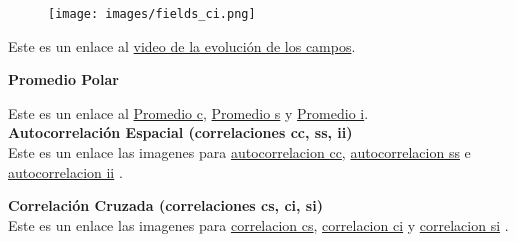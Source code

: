 \documentclass{article}
\begin{document}
\begin{figure}[htbp]
    \centering
    \texttt{[image: images/fields\_ci.png]}
    \caption{}
    \label{fig:imagen}
\end{figure}

Este es un enlace al \href{https://drive.google.com/file/d/1Hl6HBr52QO_7C0TiIAbX3hWmhV7qsdj5/view?usp=sharing}{video de la evolución de los campos}.


\textbf{Promedio Polar} 

Este es un enlace al \href{https://drive.google.com/file/d/1wWUlXln6fIPdRKu395ER4sc2wQxrvNeg/view?usp=sharing}{Promedio c}, \href{https://drive.google.com/file/d/18-IVr3RBkPF6Sv-aQMYDcZRIQnAGa0_r/view?usp=sharing}{Promedio s} y \href{https://drive.google.com/file/d/1A0mJWxUnSsrAZmOuSexXsXKUz1pK-PkT/view?usp=sharing}{Promedio i}.
\\



\textbf{Autocorrelación Espacial (correlaciones cc, ss, ii)} \\

Este es un enlace las imagenes para \href{https://drive.google.com/file/d/1SKs6iYmqRfT2GZQ8uLqQVi3mwWwliuSi/view?usp=sharing}{autocorrelacion cc}, \href{https://drive.google.com/file/d/1SFWy_DRovIJkZfi-hlySh90VjTyjFTi2/view?usp=sharing}{autocorrelacion ss} e \href{https://drive.google.com/file/d/1e8Ux9X606QRTh7phvR9jggGsIyz37SiY/view?usp=sharing}{autocorrelacion ii} .



\textbf{Correlación Cruzada (correlaciones cs, ci, si)}\\

Este es un enlace las imagenes para \href{https://drive.google.com/file/d/1HQiLCoq0TXW7r0nOZmEUQbCo2mnua54I/view?usp=sharing}{correlacion cs}, \href{https://drive.google.com/file/d/1HbKgHtY2npXeVr5coQWs0DDWxdcN9sAi/view?usp=sharing}{correlacion ci} y \href{https://drive.google.com/file/d/1h3LXM1CiXaje-c24C6aUY6VlMhE6VyAb/view?usp=sharing}{correlacion si} .
\end{document}
